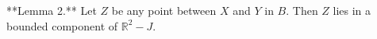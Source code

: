 **Lemma 2.** Let $Z$ be any point between $X$ and $Y$ in $B$. Then $Z$ lies in a bounded component of $\mathbb{R}^2 - J$.
